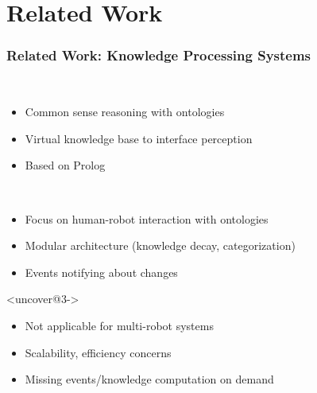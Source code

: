 \section{Related Work}
\begin{frame}
  \frametitle{Related Work: Knowledge Processing Systems}
  \begin{description}[]
  \item[KnowRob]<uncover@1-> \hfill \\
    \begin{itemize}
    \item Common sense reasoning with ontologies
    \item Virtual knowledge base to interface perception
    \item Based on Prolog
    \end{itemize}
  \smallskip
  \item[OpenRobots Ontology (ORO)]<uncover@2-> \hfill \\
    \begin{itemize}
    \item Focus on human-robot interaction with ontologies
    \item Modular architecture (knowledge decay, categorization)
    \item Events notifying about changes
    \end{itemize}
  \end{description}
  \begin{block}{}<uncover@3->
  \begin{itemize}
  \item Not applicable for multi-robot systems
  \item Scalability, efficiency concerns
  \item Missing events/knowledge computation on demand
  \end{itemize}
  \end{block}
\end{frame}


